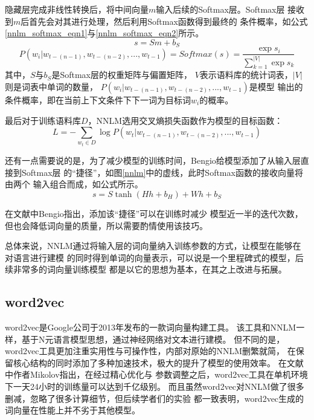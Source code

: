 隐藏层完成非线性转换后，将中间向量$m$输入后续的Softmax层。Softmax层
接收到$m$后首先会对其进行处理，然后利用Softmax函数得到最终的
条件概率，如公式\ref{nnlm_softmax_eqn1}与\ref{nnlm_softmax_eqn2}所示。
\begin{equation}
    s = Sm+b_S
    \label{nnlm_softmax_eqn1}
\end{equation}
\begin{equation}
    P\left ( w_i|w_{t-(n-1)},w_{t-(n-2)},...,w_{t-1} \right ) = 
    Softmax\left(s\right)=
    \frac{\exp s_i}{\sum_{k=1}^{|V|}\exp s_k}
    \label{nnlm_softmax_eqn2}
\end{equation}
其中，$S$与$b_S$是Softmax层的权重矩阵与偏置矩阵，
$V$表示语料库的统计词表，$|V|$则是词表中单词的数量，
$P\left ( w_i|w_{t-(n-1)},w_{t-(n-2)},...,w_{t-1} \right )$是模型
输出的条件概率，即在当前上下文条件下下一词为目标词$w_i$的概率。

最后对于训练语料库$D$，NNLM选用交叉熵损失函数作为模型的目标函数：
\begin{equation}
    L = -\sum_{w_t \in D}\log P\left ( w_t | w_{t-(n-1)},w_{t-(n-2)},...,w_{t-1} \right )
    \label{nnlm_loss_eqn}
\end{equation}


还有一点需要说的是，为了减少模型的训练时间，Bengio给模型添加了从输入层直接到Softmax层
的“捷径”，如图\ref{nnlm}中的虚线，此时Softmax函数的接收向量将由两个
输入组合而成，如公式所示。
\begin{equation}
    s = S\tanh \left ( Hh+b_H \right ) + Wh + b_S
\end{equation}

在文献\cite{bengio2003neural}中Bengio指出，添加该“捷径”可以在训练时减少
模型近一半的迭代次数，但也会降低词向量的质量，所以需要酌情使用该技巧。

总体来说，NNLM通过将输入层的词向量纳入训练参数的方式，让模型在能够在对语言进行建模
的同时得到单词的向量表示，可以说是一个里程碑式的模型，后续非常多的词向量训练模型
都是以它的思想为基本，在其之上改进与拓展。


\subsection{word2vec}
\label{sect_word2vec}
word2vec是Google公司于2013年发布的一款词向量构建工具。
该工具和NNLM一样，基于N元语言模型思想，通过神经网络对文本进行建模。
但不同的是，word2vec工具更加注重实用性与可操作性，内部对原始的NNLM删繁就简，
在保留核心结构的同时添加了多种加速技术，极大的提升了模型的使用效率。
在文献\cite{mikolov2013distributed}中作者Mikolov指出，在经过精心优化与
参数调整之后，word2vec工具在单机环境下一天24小时的训练量可以达到千亿级别。
而且虽然word2vec对NNLM做了很多删减，忽略了很多计算细节，但后续学者们的实验
都一致表明，word2vec生成的词向量在性能上并不劣于其他模型。

